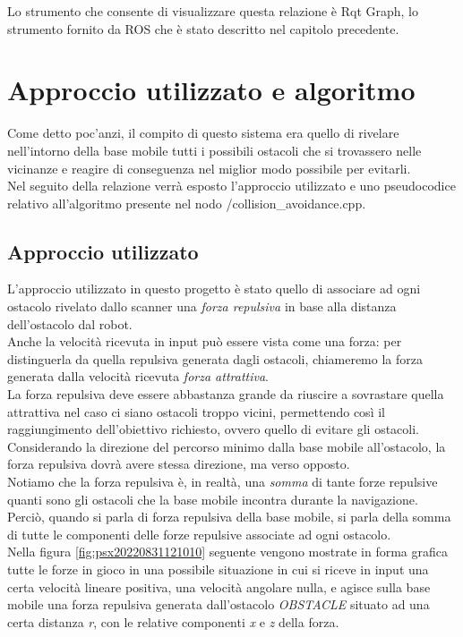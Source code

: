 Lo strumento che consente di visualizzare questa relazione è Rqt Graph, lo strumento fornito da ROS che è stato descritto nel capitolo precedente.

\section{Approccio utilizzato e algoritmo}
Come detto poc'anzi, il compito di questo sistema era quello di rivelare nell’intorno della base mobile tutti i possibili ostacoli che si trovassero nelle vicinanze e reagire di conseguenza nel miglior modo possibile per evitarli.\\
Nel seguito della relazione verrà esposto l'approccio utilizzato e uno pseudocodice relativo all'algoritmo presente nel nodo /collision\_avoidance.cpp.

\subsection{Approccio utilizzato}
L’approccio utilizzato in questo progetto è stato quello di associare ad ogni ostacolo rivelato dallo scanner una \textit{forza repulsiva} in base alla distanza dell’ostacolo dal robot.\\
Anche la velocità ricevuta in input può essere vista come una forza: per distinguerla da quella repulsiva generata dagli ostacoli, chiameremo la forza generata dalla velocità ricevuta \textit{forza attrattiva}.\\
La forza repulsiva deve essere abbastanza grande da riuscire a sovrastare quella attrattiva nel caso ci siano ostacoli troppo vicini, permettendo così il raggiungimento dell'obiettivo richiesto, ovvero quello di evitare gli ostacoli. \\Considerando la direzione del percorso minimo dalla base mobile all’ostacolo, la forza repulsiva dovrà avere stessa direzione, ma verso opposto.\\
Notiamo che la forza repulsiva è, in realtà, una \textit{somma} di tante forze repulsive quanti sono gli ostacoli che la base mobile incontra durante la navigazione. Perciò, quando si parla di forza repulsiva della base mobile, si parla della somma di tutte le componenti delle forze repulsive associate ad ogni ostacolo.\\
Nella figura \ref{fig:psx20220831121010} seguente vengono mostrate in forma grafica tutte le forze in gioco in una possibile situazione in cui si riceve in input una certa velocità lineare positiva, una velocità angolare nulla, e agisce sulla base mobile una forza repulsiva generata dall’ostacolo \textit{OBSTACLE} situato ad una certa distanza \textit{r}, con le relative componenti \textit{x} e \textit{z} della forza.

